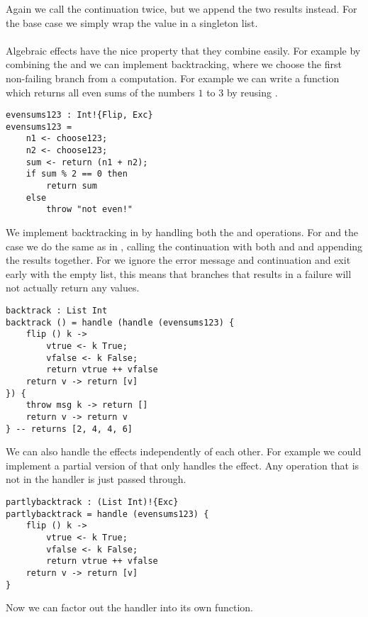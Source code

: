 Again we call the continuation  twice, but we append the two results instead.
For the  base case we simply wrap the value in a singleton list.
\\\\
Algebraic effects have the nice property that they combine easily.
For example by combining the  and  we can implement backtracking, where we choose the first non-failing branch from a computation. For example we can write a function which returns all even sums of the numbers $1$ to $3$ by reusing .

\begin{verbatim}
evensums123 : Int!{Flip, Exc}
evensums123 =
	n1 <- choose123;
	n2 <- choose123;
	sum <- return (n1 + n2);
	if sum % 2 == 0 then
		return sum
	else
		throw "not even!"
\end{verbatim}

We implement backtracking in  by handling both the  and  operations. For  and the  case we do the same as in , calling the continuation  with both  and  and appending the results together. For  we ignore the error message and continuation and exit early with the empty list, this means that branches that results in a failure will not actually return any values.

\begin{verbatim}
backtrack : List Int
backtrack () = handle (handle (evensums123) {
	flip () k ->
		vtrue <- k True;
		vfalse <- k False;
		return vtrue ++ vfalse
	return v -> return [v]
}) {
	throw msg k -> return []
	return v -> return v
} -- returns [2, 4, 4, 6]
\end{verbatim}

We can also handle the effects independently of each other. For example we could implement a partial version of  that only handles the  effect. Any operation that is not in the handler is just passed through.

\begin{verbatim}
partlybacktrack : (List Int)!{Exc}
partlybacktrack = handle (evensums123) {
	flip () k ->
		vtrue <- k True;
		vfalse <- k False;
		return vtrue ++ vfalse
	return v -> return [v]
}
\end{verbatim}

Now we can factor out the  handler into its own function.

